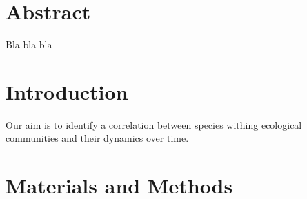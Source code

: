 \documentclass[10pt,letterpaper]{article}
\begin{document}
\vspace*{0.35in}

\begin{flushleft}
{\Large
\textbf{}
}
\newline
\end{flushleft}

\section*{Abstract}
Bla bla bla
\\
\section*{Introduction}
Our aim is to identify a correlation between species withing ecological communities and their dynamics over time. 
\\
\section*{Materials and Methods}
\end{document}
